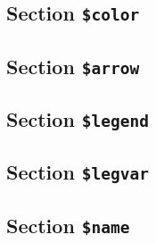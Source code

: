 \documentclass{report}
\begin{document}
\subsection{Section {\tt \$color}}




\subsection{Section {\tt \$arrow}}




\subsection{Section {\tt \$legend}}




\subsection{Section {\tt \$legvar}}




\subsection{Section {\tt \$name}}










\end{document}
